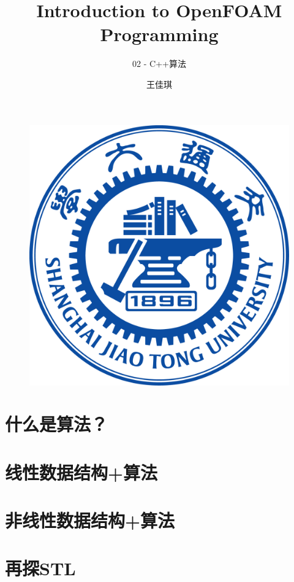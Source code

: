 \documentclass{beamer}
\author{{王佳琪}}
\title{Introduction to OpenFOAM Programming}
\subtitle{02 - C++算法}
\institute{\kaishu{上海交通大学}}
\date{\kaishu{2022年1月}}
\begin{document}
\songti
\begin{frame}
    \titlepage
    \begin{figure}[htpb]
        \begin{center}
            \includegraphics[width=0.15\linewidth]{pic/WUT.png}
        \end{center}
    \end{figure}
\end{frame}

\begin{frame}
    \tableofcontents[sectionstyle=show,subsectionstyle=show/shaded/hide,subsubsectionstyle=show/shaded/hide]
\end{frame}








\section{什么是算法？}

% 






\section{线性数据结构+算法}





\section{非线性数据结构+算法}
% 




\section{再探STL}
\end{document}
